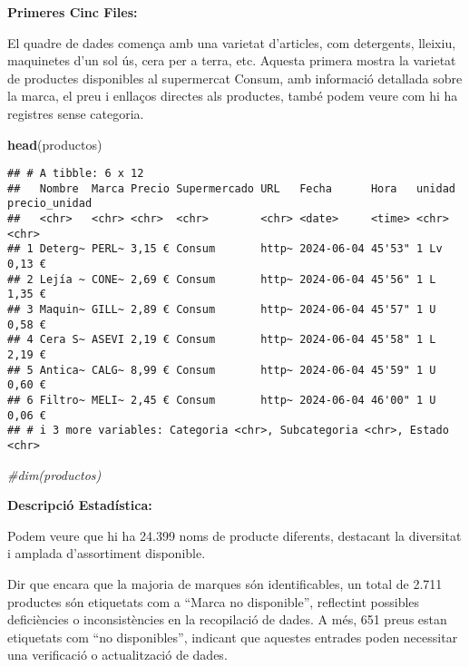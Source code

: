 \documentclass[
]{article}
\newenvironment{Shaded}{\begin{snugshade}}{\end{snugshade}}
\newcommand{\CommentTok}[1]{\textcolor[rgb]{0.56,0.35,0.01}{\textit{#1}}}
\newcommand{\FunctionTok}[1]{\textcolor[rgb]{0.13,0.29,0.53}{\textbf{#1}}}
\newcommand{\NormalTok}[1]{#1}
\begin{document}
\textbf{Primeres Cinc Files:}

El quadre de dades comença amb una varietat d'articles, com detergents,
lleixiu, maquinetes d'un sol ús, cera per a terra, etc. Aquesta primera
mostra la varietat de productes disponibles al supermercat Consum, amb
informació detallada sobre la marca, el preu i enllaços directes als
productes, també podem veure com hi ha registres sense categoria.

\begin{Shaded}
\begin{Highlighting}[]
\FunctionTok{head}\NormalTok{(productos)}
\end{Highlighting}
\end{Shaded}

\begin{verbatim}
## # A tibble: 6 x 12
##   Nombre  Marca Precio Supermercado URL   Fecha      Hora   unidad precio_unidad
##   <chr>   <chr> <chr>  <chr>        <chr> <date>     <time> <chr>  <chr>        
## 1 Deterg~ PERL~ 3,15 € Consum       http~ 2024-06-04 45'53" 1 Lv   0,13 €       
## 2 Lejía ~ CONE~ 2,69 € Consum       http~ 2024-06-04 45'56" 1 L    1,35 €       
## 3 Maquin~ GILL~ 2,89 € Consum       http~ 2024-06-04 45'57" 1 U    0,58 €       
## 4 Cera S~ ASEVI 2,19 € Consum       http~ 2024-06-04 45'58" 1 L    2,19 €       
## 5 Antica~ CALG~ 8,99 € Consum       http~ 2024-06-04 45'59" 1 U    0,60 €       
## 6 Filtro~ MELI~ 2,45 € Consum       http~ 2024-06-04 46'00" 1 U    0,06 €       
## # i 3 more variables: Categoria <chr>, Subcategoria <chr>, Estado <chr>
\end{verbatim}

\begin{Shaded}
\begin{Highlighting}[]
\CommentTok{\#dim(productos)}
\end{Highlighting}
\end{Shaded}

\textbf{Descripció Estadística:}

Podem veure que hi ha 24.399 noms de producte diferents, destacant la
diversitat i amplada d'assortiment disponible.

Dir que encara que la majoria de marques són identificables, un total de
2.711 productes són etiquetats com a ``Marca no disponible'', reflectint
possibles deficiències o inconsistències en la recopilació de dades. A
més, 651 preus estan etiquetats com ``no disponibles'', indicant que
aquestes entrades poden necessitar una verificació o actualització de
dades.
\end{document}
